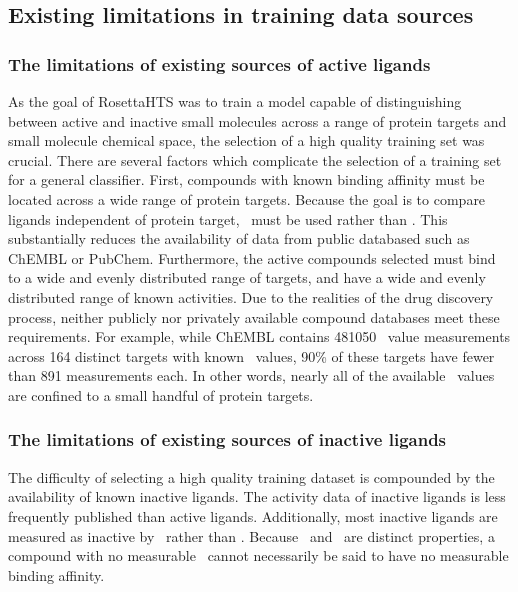 \subsection{Existing limitations in training data sources}

\subsubsection{The limitations of existing sources of active ligands}
As the goal of RosettaHTS was to train a model capable of distinguishing between active and inactive small molecules across a range of protein targets and small molecule chemical space, the selection of a high quality training set was crucial.
There are several factors which complicate the selection of a training set for a general classifier.
First, compounds with known binding affinity must be located across a wide range of protein targets.
Because the goal is to compare ligands independent of protein target, \ki\ must be used rather than \ic.
This substantially reduces the availability of data from public databased such as ChEMBL or PubChem. 
Furthermore, the active compounds selected must bind to a wide and evenly distributed range of targets, and have a wide and evenly distributed range of known activities.
Due to the realities of the drug discovery process, neither publicly nor privately available compound databases meet these requirements.
For example, while ChEMBL contains 481050 \ki\ value measurements across 164 distinct targets with known \ki\ values, 90\% of these targets have fewer than 891 measurements each.
In other words, nearly all of the available \ki\ values are confined to a small handful of protein targets.

\subsubsection{The limitations of existing sources of inactive ligands}
The difficulty of selecting a high quality training dataset is compounded by the availability of known inactive ligands. 
The activity data of inactive ligands is less frequently published than active ligands.
Additionally, most inactive ligands are measured as inactive by \ic\ rather than \ki.
Because \ic\ and \ki\ are distinct properties, a compound with no measurable \ic\ cannot necessarily be said to have no measurable binding affinity.

